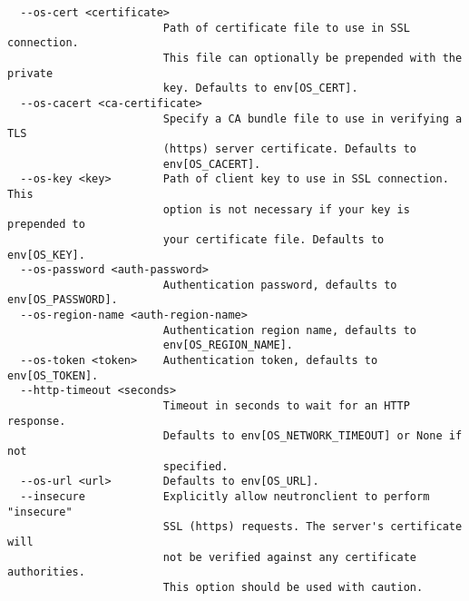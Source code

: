 \documentclass[a4paper,left=1.5cm,right=1.5cm,11pt]{article}
\begin{document}
\begin{lstlisting}
  --os-cert <certificate>
                        Path of certificate file to use in SSL connection.
                        This file can optionally be prepended with the private
                        key. Defaults to env[OS_CERT].
  --os-cacert <ca-certificate>
                        Specify a CA bundle file to use in verifying a TLS
                        (https) server certificate. Defaults to
                        env[OS_CACERT].
  --os-key <key>        Path of client key to use in SSL connection. This
                        option is not necessary if your key is prepended to
                        your certificate file. Defaults to env[OS_KEY].
  --os-password <auth-password>
                        Authentication password, defaults to env[OS_PASSWORD].
  --os-region-name <auth-region-name>
                        Authentication region name, defaults to
                        env[OS_REGION_NAME].
  --os-token <token>    Authentication token, defaults to env[OS_TOKEN].
  --http-timeout <seconds>
                        Timeout in seconds to wait for an HTTP response.
                        Defaults to env[OS_NETWORK_TIMEOUT] or None if not
                        specified.
  --os-url <url>        Defaults to env[OS_URL].
  --insecure            Explicitly allow neutronclient to perform "insecure"
                        SSL (https) requests. The server's certificate will
                        not be verified against any certificate authorities.
                        This option should be used with caution.


\end{lstlisting}
\end{document}
